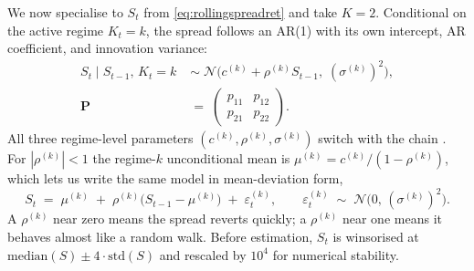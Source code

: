 We now specialise to $S_t$ from \eqref{eq:rollingspreadret} and take $K = 2$. Conditional on the active regime $K_t = k$, the spread follows an AR(1) with its own intercept, AR coefficient, and innovation variance:
\begin{equation}\label{eq:msargen}
\begin{aligned}
    S_t \mid S_{t-1},\, K_t = k \;&\sim\; \mathcal{N}\!\bigl(c^{(k)} + \rho^{(k)} S_{t-1},\;(\sigma^{(k)})^{2}\bigr),\\[4pt]
    \mathbf{P} \;&=\; \begin{pmatrix} p_{11} & p_{12} \\ p_{21} & p_{22} \end{pmatrix}.
\end{aligned}
\end{equation}
All three regime-level parameters $(c^{(k)},\rho^{(k)},\sigma^{(k)})$ switch with the chain \parencite{krolzig1997msvar}. For $|\rho^{(k)}|<1$ the regime-$k$ unconditional mean is $\mu^{(k)} = c^{(k)}/(1-\rho^{(k)})$, which lets us write the same model in mean-deviation form,
\begin{equation}\label{eq:meandevparam}
    S_t \;=\; \mu^{(k)} \;+\; \rho^{(k)}\bigl(S_{t-1} - \mu^{(k)}\bigr) \;+\; \varepsilon_t^{(k)},
    \qquad
    \varepsilon_t^{(k)} \;\sim\; \mathcal{N}\bigl(0,\,(\sigma^{(k)})^{2}\bigr).
\end{equation}
A $\rho^{(k)}$ near zero means the spread reverts quickly; a $\rho^{(k)}$ near one means it behaves almost like a random walk. Before estimation, $S_t$ is winsorised at $\mathrm{median}(S) \pm 4\cdot\mathrm{std}(S)$ and rescaled by $10^{4}$ for numerical stability.

